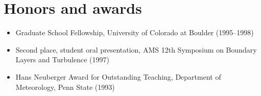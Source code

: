 \section{Honors and awards}
\vspace{0.5em}

\begin{itemize}

  \item Graduate School Fellowship, University of Colorado at Boulder
    (1995--1998)

  \item Second place, student oral presentation, AMS 12th Symposium on
    Boundary Layers and Turbulence (1997)

  \item Hans Neuberger Award for Outstanding Teaching, Department of
    Meteorology, Penn State (1993)

\end{itemize}
